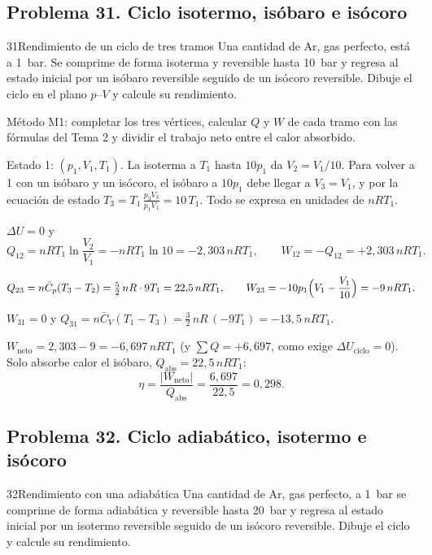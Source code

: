 \subsection{Problema 31. Ciclo isotermo, isóbaro e isócoro}
\begin{problema}{31}{Rendimiento de un ciclo de tres tramos}
Una cantidad de Ar, gas perfecto, está a \SI{1}{bar}. Se comprime de forma isoterma y reversible hasta
\SI{10}{bar} y regresa al estado inicial por un isóbaro reversible seguido de un isócoro reversible. Dibuje el ciclo
en el plano $p$--$V$ y calcule su rendimiento.
\end{problema}

\begin{resolucion}
\idea Método M1: completar los tres vértices, calcular $Q$ y $W$ de cada tramo con las fórmulas del Tema 2 y
dividir el trabajo neto entre el calor absorbido.

 Estado 1: $(p_1,V_1,T_1)$. La isoterma a $T_1$ hasta $10p_1$ da $V_2=V_1/10$. Para volver
a 1 con un isóbaro y un isócoro, el isóbaro a $10p_1$ debe llegar a $V_3=V_1$, y por la ecuación de estado
$T_3=T_1\,\frac{p_3V_3}{p_1V_1}=10\,T_1$. Todo se expresa en unidades de $nRT_1$.

 $\Delta U=0$ y
\[
  Q_{12}=nRT_1\ln\frac{V_2}{V_1}=-nRT_1\ln10=-2{,}303\,nRT_1,\qquad W_{12}=-Q_{12}=+2{,}303\,nRT_1 .
\]

\[
  Q_{23}=n\bar C_p(T_3-T_2)=\tfrac52\,nR\cdot9T_1=22{,}5\,nRT_1,\qquad
  W_{23}=-10p_1\Bigl(V_1-\frac{V_1}{10}\Bigr)=-9\,nRT_1 .
\]

$W_{31}=0$ y $Q_{31}=n\bar C_V(T_1-T_3)=\tfrac32\,nR\,(-9T_1)=-13{,}5\,nRT_1$.

 $W_{\mathrm{neto}}=2{,}303-9=-6{,}697\,nRT_1$ (y $\sum Q=+6{,}697$,
como exige $\Delta U_{\mathrm{ciclo}}=0$). Solo absorbe calor el isóbaro, $Q_{\mathrm{abs}}=22{,}5\,nRT_1$:
\[
  \eta=\frac{|W_{\mathrm{neto}}|}{Q_{\mathrm{abs}}}=\frac{6{,}697}{22{,}5}=\boxed{0{,}298}.
\]
\end{resolucion}



\subsection{Problema 32. Ciclo adiabático, isotermo e isócoro}
\begin{problema}{32}{Rendimiento con una adiabática}
Una cantidad de Ar, gas perfecto, a \SI{1}{bar} se comprime de forma adiabática y reversible hasta \SI{20}{bar} y
regresa al estado inicial por un isotermo reversible seguido de un isócoro reversible. Dibuje el ciclo y calcule su
rendimiento.
\end{problema}

